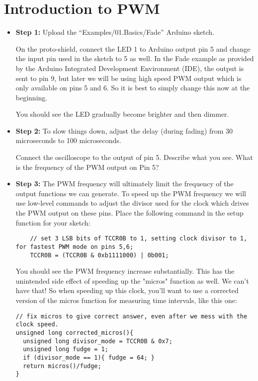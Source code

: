 \documentclass[12pt]{article}
\begin{document}
\section{Introduction to PWM}
\begin{itemize}
\item {\bf Step 1:} Upload the ``Examples/01.Basics/Fade'' Arduino sketch.

On the proto-shield, connect the LED 1 to Arduino output pin 5 and change the input pin used in the sketch to 5 as well.  In the Fade example as provided by the Arduino Integrated Development Environment (IDE), 
the output is sent to pin 9, but later we will be using high speed PWM output which is
only available on pins 5 and 6.  So it is best to simply change this now at the beginning.

You should see the LED gradually become brighter and then dimmer.

\item {\bf Step 2:} To slow things down, adjust the delay (during fading) from 30
microseconds to 100 microseconds.  

Connect the oscilloscope to the output of pin 5.  Describe what you see.  What is the frequency of the PWM output on Pin 5?

\item {\bf Step 3:} The PWM frequency will ultimately limit the frequency of the output functions we can generate.  To speed up the PWM frequency we will use low-level commands to adjust the divisor used for the clock which drives the PWM output on these pins.  Place the following command in the setup function for your sketch:
\begin{verbatim}
    // set 3 LSB bits of TCCR0B to 1, setting clock divisor to 1, for fastest PWM mode on pins 5,6;
    TCCR0B = (TCCR0B & 0xb1111000) | 0b001;
\end{verbatim}
You should see the PWM frequency increase substantially.  This has the unintended side effect of speeding up the "micros" function as well.  We can't have that!  So when speeding up this clock, you'll want to use a corrected version of the micros function for measuring time intervals, like this one:

\begin{verbatim}
// fix micros to give correct answer, even after we mess with the clock speed.
unsigned long corrected_micros(){
  unsigned long divisor_mode = TCCR0B & 0x7;
  unsigned long fudge = 1;
  if (divisor_mode == 1){ fudge = 64; }  
  return micros()/fudge;
}
\end{verbatim}

\end{itemize}
\end{document}

